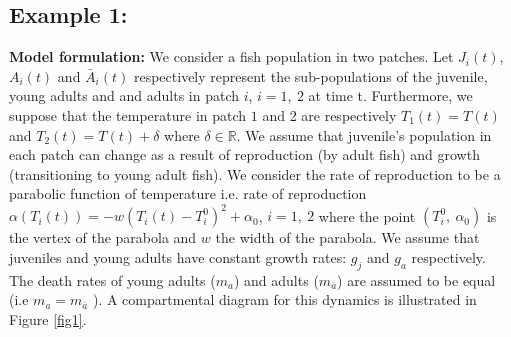\documentclass[12pt, table]{article}
\begin{document}
\subsection{Example 1: }
{\bf Model formulation:}  We consider a fish  population  in two patches. Let $J_i(t)$, $A_i(t)$ and $\bar{A}_i(t)$ respectively represent the sub-populations of the juvenile, young adults and and adults  in patch $i$, $i = 1,~2$ at time t.  Furthermore, we suppose  that the temperature in patch $1$ and 2 are respectively $T_1(t)=T(t)$ and $T_2(t)=T(t)+\delta$ where $\delta \in \mathbb{R}$.  We assume  that  juvenile's population in each patch  can change as  a result of reproduction (by adult fish) and  growth (transitioning to young adult fish). We consider the rate of  reproduction to be a  parabolic function of temperature i.e. rate of reproduction $\alpha(T_i(t))=-w(T_i(t)-T_i^0)^2+\alpha_0$, $i=1,~2$ where the point $(T_i^0,~\alpha_0)$  is the vertex of the parabola and $w$ the width of the parabola. We assume  that juveniles and young adults have  constant growth rates:  $g_j$ and $g_a$ respectively.  The death rates of young adults ($m_a$) and adults   ($m_{\bar{a}}$) are assumed to be equal (i.e $m_a=m_{\bar{a}}$ ). A compartmental diagram for this dynamics  is illustrated in  Figure \eqref{fig1}. 
\end{document}
